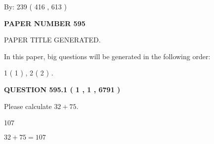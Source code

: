 \documentclass[12pt]{article}
\begin{document}
   
\hspace{1.0in} By: 
 239 ( 416 ,  613 )
   
   
   
   
\newpage 
\setcounter{page}{ 
   595001 } 
   
   
   
   
 {\textbf{ \Large{ PAPER NUMBER  595  }}}
   
   
\vspace{0.2in}
   
   
   
   
   
   
   
   
 \vspace{0.2in}
 
 
 
 
   
   
 PAPER TITLE GENERATED.
   
   
   
\vspace{0.2in}
   
In this paper, big questions will be generated in the following order: 
   
   
   1 ( 1 )
 ,
   2 ( 2 )
 .
  
\vspace{0.2in}
  
{\textbf{\Large{QUESTION
595.1 
 ( 1 , 1 , 6791 )
}}}
  
  
 
Please calculate $ %
32 +  %
75 $.
 
 
 
\noindent{}
 
 

107
 
 
\noindent{}
 
 

 
 
 
\noindent{}
 
 

$ %
32 +  %
75=   %
107$
 
 
\noindent{}
 
\end{document}
